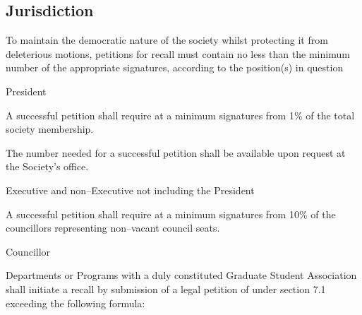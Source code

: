 \subsection{Jurisdiction}
To maintain the democratic nature of the society whilst protecting it from deleterious motions, petitions for recall must contain no less than the minimum number of the appropriate signatures, according to the position(s) in question

\begin{longenum}[ label*=\thesubsection.\arabic*., align=left]
	\item President
    \begin{longenum}[ label*=\arabic*., align=left]
		\item A successful petition shall require at a minimum signatures from 1\% of the total society membership.
    	\begin{longenum}[ label*=\arabic*., align=left]
			\item The number needed for a successful petition shall be available upon request at the Society's office.
		\end{longenum}
	\end{longenum}
   \item Executive and non--Executive not including the President
    \begin{longenum}[ label*=\arabic*., align=left]
		\item A successful petition shall require at a minimum signatures from 10\% of the councillors representing non--vacant council seats.
	\end{longenum}
	\item Councillor
    \begin{longenum}[ label*=\arabic*., align=left]
		\item Departments or Programs with a duly constituted Graduate Student Association shall initiate a recall by submission of a legal petition of under section 7.1 exceeding the following formula: \newline
        

\end{longenum}
\end{longenum}

